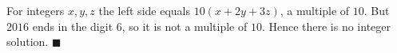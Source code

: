 For integers $x,y,z$ the left side equals $10(x+2y+3z)$, a multiple of $10$. But $2016$ ends in the digit $6$, so it is not a multiple of $10$. Hence there is no integer solution. $\blacksquare$
